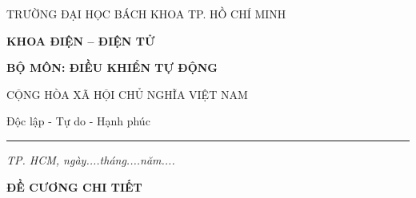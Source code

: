 \clearpage
{}
\thispagestyle{empty}
\begingroup
\pagestyle{empty}
\setlength{\parindent}{0pt}
\setlength{\parskip}{0pt}
\fontsize{12}{16}\selectfont

\noindent
\begin{minipage}[t]{0.51\textwidth}
  \centering
  {\fontsize{10}{14}\selectfont
  TRƯỜNG ĐẠI HỌC BÁCH KHOA TP. HỒ CHÍ MINH\par}
  \vspace{1mm}
  \textbf{KHOA ĐIỆN -- ĐIỆN TỬ}\par
  \vspace{1mm}
  \textbf{BỘ MÔN: ĐIỀU KHIỂN TỰ ĐỘNG}
\end{minipage}\hfill
\begin{minipage}[t]{0.47\textwidth}
  \centering
  {\fontsize{10}{14}\selectfont
  CỘNG HÒA XÃ HỘI CHỦ NGHĨA VIỆT NAM\par
  \vspace{1mm}
  Độc lập - Tự do - Hạnh phúc\par
  \rule{0.6\linewidth}{0.4pt}\par} 
  \vspace{4mm}
  {\fontsize{10}{14}\selectfont\itshape
  TP. HCM, ngày....tháng....năm....}
\end{minipage}

\vspace{5mm}
\begin{center}
  \textbf{ĐỀ CƯƠNG CHI TIẾT}
\end{center}
\vspace{1mm}

